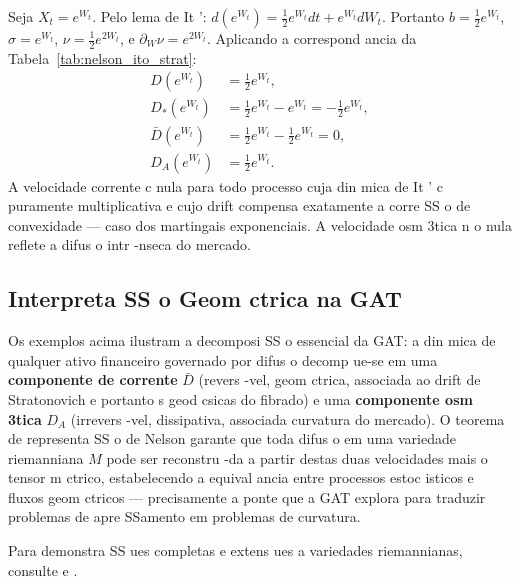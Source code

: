 Seja $X_t = e^{W_t}$. Pelo lema de It ': $d(e^{W_t}) = \frac{1}{2}e^{W_t}dt + e^{W_t}dW_t$. Portanto $b = \frac{1}{2}e^{W_t}$, $\sigma = e^{W_t}$, $\nu = \frac{1}{2}e^{2W_t}$, e $\partial_W\nu = e^{2W_t}$. Aplicando a correspond ancia da Tabela~\ref{tab:nelson_ito_strat}:
\begin{align*}
 D(e^{W_t}) &= \frac{1}{2}e^{W_t}, \\
 D_*(e^{W_t}) &= \frac{1}{2}e^{W_t} - e^{W_t} = -\frac{1}{2}e^{W_t}, \\
 \bar{D}(e^{W_t})&= \frac{1}{2}e^{W_t} - \frac{1}{2}e^{W_t} = 0, \\
 D_A(e^{W_t}) &= \frac{1}{2}e^{W_t}.
\end{align*}
A velocidade corrente c nula para todo processo cuja din mica de It ' c puramente multiplicativa e cujo drift compensa exatamente a corre SS o de convexidade --- caso dos martingais exponenciais. A velocidade osm 3tica n o nula reflete a difus o intr -nseca do mercado.

\subsection{Interpreta SS o Geom ctrica na GAT}

Os exemplos acima ilustram a decomposi SS o essencial da GAT: a din mica de qualquer ativo financeiro governado por difus o decomp ue-se em uma \textbf{componente de corrente} $\bar{D}$ (revers -vel, geom ctrica, associada ao drift de Stratonovich e portanto s geod csicas do fibrado) e uma \textbf{componente osm 3tica} $D_A$ (irrevers -vel, dissipativa, associada curvatura do mercado). O teorema de representa SS o de Nelson garante que toda difus o em uma variedade riemanniana $M$ pode ser reconstru -da a partir destas duas velocidades mais o tensor m ctrico, estabelecendo a equival ancia entre processos estoc isticos e fluxos geom ctricos --- precisamente a ponte que a GAT explora para traduzir problemas de apre SSamento em problemas de curvatura.

Para demonstra SS ues completas e extens ues a variedades riemannianas, consulte  e .

\endinput


